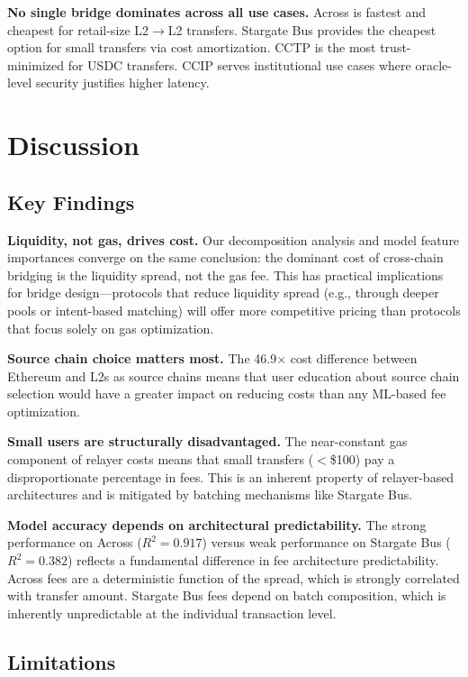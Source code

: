 \normalsize

\noindent \textbf{No single bridge dominates across all use cases.} Across is fastest and cheapest for retail-size L2$\to$L2 transfers. Stargate Bus provides the cheapest option for small transfers via cost amortization. CCTP is the most trust-minimized for USDC transfers. CCIP serves institutional use cases where oracle-level security justifies higher latency.


\section{Discussion}\label{sec: discussion}

\subsection{Key Findings}

\textbf{Liquidity, not gas, drives cost.} Our decomposition analysis and model feature importances converge on the same conclusion: the dominant cost of cross-chain bridging is the liquidity spread, not the gas fee. This has practical implications for bridge design---protocols that reduce liquidity spread (e.g., through deeper pools or intent-based matching) will offer more competitive pricing than protocols that focus solely on gas optimization.

\textbf{Source chain choice matters most.} The 46.9$\times$ cost difference between Ethereum and L2s as source chains means that user education about source chain selection would have a greater impact on reducing costs than any ML-based fee optimization.

\textbf{Small users are structurally disadvantaged.} The near-constant gas component of relayer costs means that small transfers ($<$\$100) pay a disproportionate percentage in fees. This is an inherent property of relayer-based architectures and is mitigated by batching mechanisms like Stargate Bus.

\textbf{Model accuracy depends on architectural predictability.} The strong performance on Across ($R^2 = 0.917$) versus weak performance on Stargate Bus ($R^2 = 0.382$) reflects a fundamental difference in fee architecture predictability. Across fees are a deterministic function of the spread, which is strongly correlated with transfer amount. Stargate Bus fees depend on batch composition, which is inherently unpredictable at the individual transaction level.

\subsection{Limitations}

